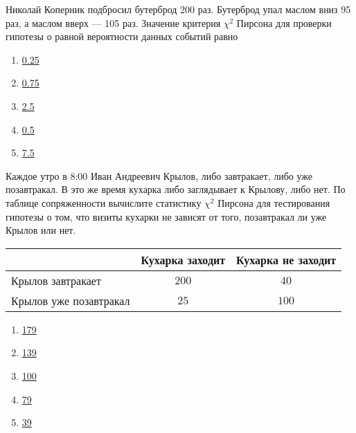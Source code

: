 \documentclass[t]{beamer}
\begin{document}
 \begin{frame} \label{15} 
\begin{block}{15} 

Николай Коперник подбросил бутерброд 200 раз. Бутерброд упал маслом вниз 95 раз, а маслом вверх — 105 раз. Значение критерия $\chi^2$ Пирсона для проверки гипотезы о равной вероятности данных событий равно
 


 \end{block} 
\begin{enumerate} 
\item[] \hyperlink{15-No}{\beamergotobutton{} 0.25}
\item[] \hyperlink{15-No}{\beamergotobutton{} 0.75}
\item[] \hyperlink{15-No}{\beamergotobutton{} 2.5}
\item[] \hyperlink{15-Yes}{\beamergotobutton{} 0.5}
\item[] \hyperlink{15-No}{\beamergotobutton{} 7.5}
\end{enumerate} 
\end{frame} 


 \begin{frame} \label{16} 
\begin{block}{16} 

Каждое утро в 8:00 Иван Андреевич Крылов, либо завтракает, либо уже позавтракал. В это же время кухарка либо заглядывает к Крылову, либо нет. По таблице сопряженности вычислите  статистику $\chi^2$ Пирсона для тестирования гипотезы о том, что визиты кухарки не зависят от того, позавтракал ли уже Крылов или нет.

\begin{tabular}{@{}l|cc@{}}
\toprule
                       & Кухарка заходит & Кухарка не заходит \\ \midrule
Крылов завтракает      & $200$           & $40$               \\
Крылов уже позавтракал & $25$            & $100$              \\ \bottomrule
\end{tabular}

 


 \end{block} 
\begin{enumerate} 
\item[] \hyperlink{16-No}{\beamergotobutton{} 179}
\item[] \hyperlink{16-Yes}{\beamergotobutton{} 139}
\item[] \hyperlink{16-No}{\beamergotobutton{} 100}
\item[] \hyperlink{16-No}{\beamergotobutton{} 79}
\item[] \hyperlink{16-No}{\beamergotobutton{} 39}
\end{enumerate} 
\end{frame} 
\end{document}
